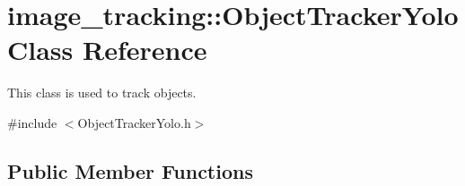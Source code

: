 \hypertarget{classimage__tracking_1_1_object_tracker_yolo}{}\section{image\+\_\+tracking\+:\+:Object\+Tracker\+Yolo Class Reference}
\label{classimage__tracking_1_1_object_tracker_yolo}


This class is used to track objects.  




{\ttfamily \#include $<$Object\+Tracker\+Yolo.\+h$>$}

\subsection*{Public Member Functions}
